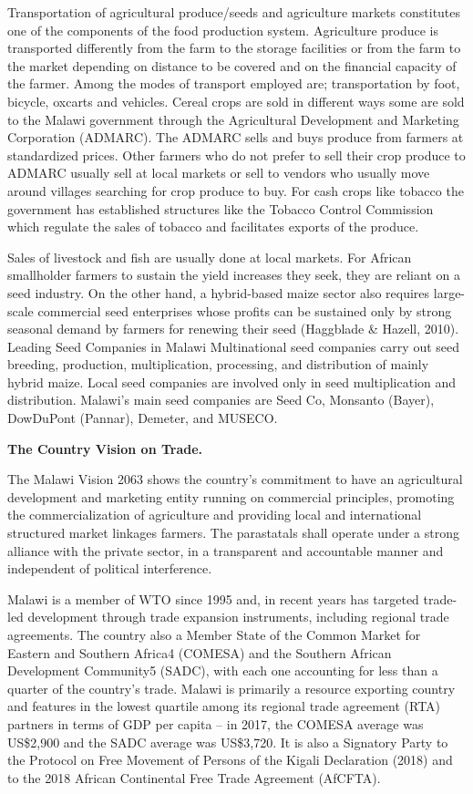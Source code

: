 \documentclass[
]{book}
\begin{document}
Transportation of agricultural produce/seeds and agriculture markets constitutes one of the components of the food production system. Agriculture produce is transported differently from the farm to the storage facilities or from the farm to the market depending on distance to be covered and on the financial capacity of the farmer. Among the modes of transport employed are; transportation by foot, bicycle, oxcarts and vehicles. Cereal crops are sold in different ways some are sold to the Malawi government through the Agricultural Development and Marketing Corporation (ADMARC). The ADMARC sells and buys produce from farmers at standardized prices. Other farmers who do not prefer to sell their crop produce to ADMARC usually sell at local markets or sell to vendors who usually move around villages searching for crop produce to buy. For cash crops like tobacco the government has established structures like the Tobacco Control Commission which regulate the sales of tobacco and facilitates exports of the produce.

Sales of livestock and fish are usually done at local markets. For African smallholder farmers to sustain the yield increases they seek, they are reliant on a seed industry. On the other hand, a hybrid-based maize sector also requires large-scale commercial seed enterprises whose profits can be sustained only by strong seasonal demand by farmers for renewing their seed (Haggblade \& Hazell, 2010). Leading Seed Companies in Malawi Multinational seed companies carry out seed breeding, production, multiplication, processing, and distribution of mainly hybrid maize. Local seed companies are involved only in seed multiplication and distribution. Malawi's main seed companies are Seed Co, Monsanto (Bayer), DowDuPont (Pannar), Demeter, and MUSECO.

\textbf{The Country Vision on Trade.}

The Malawi Vision 2063 shows the country's commitment to have an agricultural development and marketing entity running on commercial principles, promoting the commercialization of agriculture and providing local and international structured market linkages farmers. The parastatals shall operate under a strong alliance with the private sector, in a transparent and accountable manner and independent of political interference.

Malawi is a member of WTO since 1995 and, in recent years has targeted trade-led development through trade expansion instruments, including regional trade agreements. The country also a Member State of the Common Market for Eastern and Southern Africa4 (COMESA) and the Southern African Development Community5 (SADC), with each one accounting for less than a quarter of the country's trade. Malawi is primarily a resource exporting country and features in the lowest quartile among its regional trade agreement (RTA) partners in terms of GDP per capita -- in 2017, the COMESA average was US\$2,900 and the SADC average was US\$3,720. It is also a Signatory Party to the Protocol on Free Movement of Persons of the Kigali Declaration (2018) and to the 2018 African Continental Free Trade Agreement (AfCFTA).
\end{document}

